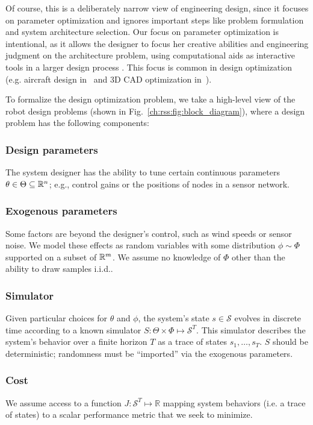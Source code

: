 Of course, this is a deliberately narrow view of engineering design, since it focuses on parameter optimization and ignores important steps like problem formulation and system architecture selection. Our focus on parameter optimization is intentional, as it allows the designer to focus her creative abilities and engineering judgment on the architecture problem, using computational aids as interactive tools in a larger design process \cite{sharpe_thesis,cascaval2021differentiable}. This focus is common in design optimization (e.g. aircraft design in~\cite{sharpe_thesis} and 3D CAD optimization in~\cite{cascaval2021differentiable}).

To formalize the design optimization problem, we take a high-level view of the robot design problems (shown in Fig.~\ref{ch:rss:fig:block_diagram}), where a design problem has the following components:

\subsubsection{Design parameters} The system designer has the ability to tune certain continuous parameters $\theta \in \Theta \subseteq \mathbb{R}^n$; e.g., control gains or the positions of nodes in a sensor network.
\subsubsection{Exogenous parameters} Some factors are beyond the designer's control, such as wind speeds or sensor noise. We model these effects as random variables with some distribution $\phi \sim \Phi$ supported on a subset of $\mathbb{R}^m$. We assume no knowledge of $\Phi$ other than the ability to draw samples i.i.d..
\subsubsection{Simulator} Given particular choices for $\theta$ and $\phi$, the system's state $s \in \mathcal{S}$ evolves in discrete time according to a known simulator $S : \Theta \times \Phi \mapsto \mathcal{S}^T$. This simulator describes the system's behavior over a finite horizon $T$ as a trace of states $s_1, \ldots, s_T$. $S$ should be deterministic; randomness must be ``imported'' via the exogenous parameters.
\subsubsection{Cost} We assume access to a function $J: \mathcal{S}^T \mapsto \mathbb{R}$ mapping system behaviors (i.e. a trace of states) to a scalar performance metric that we seek to minimize.
